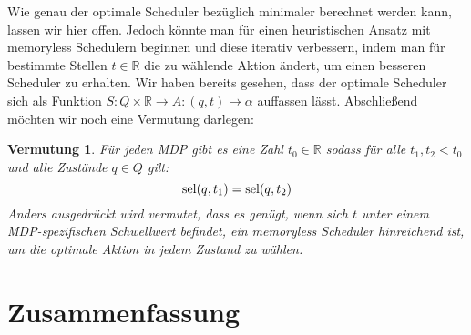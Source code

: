 \documentclass[a4paper]{article}
\newtheorem{vermutung}[satz]{Vermutung}
\theoremstyle{nonumberplain}
\begin{document}
	\begin{comment}
	Wir haben also das Problem, für einen gegebenen Zustand $q$ und ein gegebenes Ziel $t$ den Scheduler $\mathcal{S}$ zu finden, der $\mvt_{\mathcal{S},q}(\tilde{R},t)$ minimiert, auf das Bestimmen von $g(q,x)$ für Zustände $q$ und diskrete Stellen $x \in \mathbb{R}$ zurückgeführt. Dieses lässt sich auch als Optimierungsproblem auffassen: Wähle die Funktion $g$ so, dass $g(q,t)$ maximal wird und dabei für alle $x\in \mathbb{R}$ gilt:
	\begin{align}
	g(q,x) &= x^2 && \text{falls } q\in T\\
	g(q,x) &\leq \sum_{q' \in Q} P(q,\alpha,q') \cdot g\big(q',x -R(q,\alpha,q')\big) && \text{falls }q \notin T, \alpha \in A
	\end{align}
	
	Wie dieses Problem gelöst bzw. effizient gelöst werden kann, lassen wir an dieser Stelle offen.
	\end{comment}
	
	Wie genau der optimale Scheduler bezüglich minimaler \vt{} berechnet werden kann, lassen wir hier offen.
	Jedoch könnte man für einen heuristischen Ansatz mit memoryless Schedulern beginnen und diese iterativ verbessern, indem man für bestimmte Stellen $t\in \mathbb{R}$ die zu wählende Aktion ändert, um einen besseren Scheduler zu erhalten. Wir haben bereits gesehen, dass der optimale Scheduler sich als Funktion $S : Q \times \mathbb{R} \to A : (q,t) \mapsto \alpha$ auffassen lässt.
	Abschließend möchten wir noch eine Vermutung darlegen:
	
	\begin{vermutung}
		Für jeden MDP \mdpex{} gibt es eine Zahl $t_0\in \mathbb{R}$ sodass für alle $t_1,t_2 < t_0$ und alle Zustände $q\in Q$ gilt:
		\begin{equation}
		\mathrm{sel}(q,t_1) = \mathrm{sel}(q,t_2)
		\end{equation}
		Anders ausgedrückt wird vermutet, dass es genügt, wenn sich $t$ unter einem MDP-spezifischen Schwellwert befindet, ein memoryless Scheduler hinreichend ist, um die optimale Aktion in jedem Zustand zu wählen. 
	\end{vermutung}
	
	\section{Zusammenfassung}
	
\end{document}
